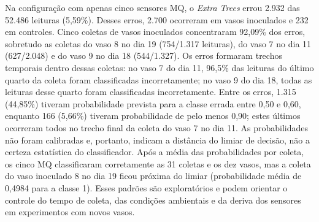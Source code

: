 Na configuração com apenas cinco sensores MQ, o \textit{Extra Trees} errou 2.932 das 52.486 leituras (5,59\%). Desses erros, 2.700 ocorreram em vasos inoculados e 232 em controles. Cinco coletas de vasos inoculados concentraram 92,09\% dos erros, sobretudo as coletas do vaso 8 no dia 19 (754/1.317 leituras), do vaso 7 no dia 11 (627/2.048) e do vaso 9 no dia 18 (544/1.327). Os erros formaram trechos temporais dentro dessas coletas: no vaso 7 do dia 11, 96,5\% das leituras do último quarto da coleta foram classificadas incorretamente; no vaso 9 do dia 18, todas as leituras desse quarto foram classificadas incorretamente. Entre os erros, 1.315 (44,85\%) tiveram probabilidade prevista para a classe errada entre 0,50 e 0,60, enquanto 166 (5,66\%) tiveram probabilidade de pelo menos 0,90; estes últimos ocorreram todos no trecho final da coleta do vaso 7 no dia 11. As probabilidades não foram calibradas e, portanto, indicam a distância do limiar de decisão, não a certeza estatística do classificador. Após a média das probabilidades por coleta, os cinco MQ classificaram corretamente as 31 coletas e os dez vasos, mas a coleta do vaso inoculado 8 no dia 19 ficou próxima do limiar (probabilidade média de 0,4984 para a classe 1). Esses padrões são exploratórios e podem orientar o controle do tempo de coleta, das condições ambientais e da deriva dos sensores em experimentos com novos vasos.

